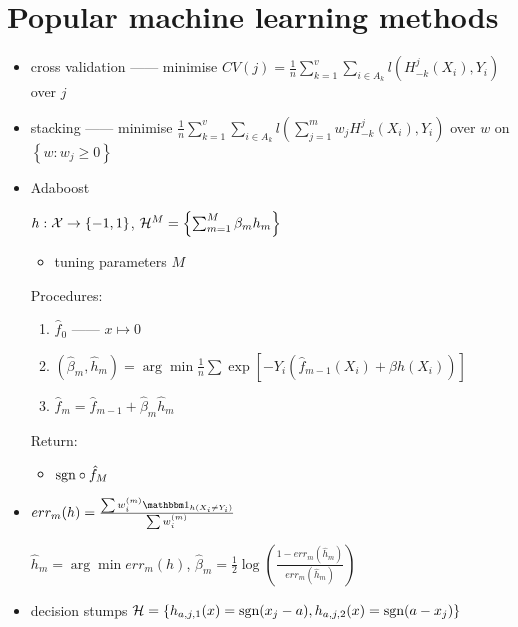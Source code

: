 \section{Popular machine learning methods}\label{sec:popular-machine-learning-methods}

\begin{itemize}
    \item cross validation ------ minimise $CV(j) = \frac{1}{n} \sum_{k=1}^v \sum_{i \in A_k} l(H_{-k}^j(X_i), Y_i)$ over $j$
    \item stacking ------ minimise $\frac{1}{n} \sum_{k=1}^v \sum_{i \in A_k} l(\sum_{j=1}^m w_j H_{-k}^j(X_i), Y_i)$ over $w$ on $\left\{ w : w_j \geq 0 \right\}$
    \item Adaboost
    \begin{setting}
        $h : \mathcal{X} \rightarrow \left\{ -1, 1 \right\}$, $\mathcal{H}^M = \left\{ \sum_{m=1}^M \beta_m h_m  \right\}$
    \end{setting}
    \begin{itemize}
        \item tuning parameters $M$
    \end{itemize}
    Procedures:
    \begin{enumerate}
        \item $\hat f_0$ ------ $x \mapsto 0$
        \item $(\hat \beta_m, \hat h_m) = \arg \min \frac{1}{n} \sum \exp [-Y_i(\hat f_{m-1}(X_i) + \beta h(X_i))]$
        \item $\hat f_m = \hat f_{m-1} + \hat \beta_m \hat h_m$
    \end{enumerate}
    Return:
    \begin{itemize}
        \item $\textnormal{sgn} \circ \hat f_M$
    \end{itemize}
    \item $err_m(h) = \frac{\sum w_{i}^{(m)} \In_{h(X_i \neq Y_i)}}{\sum w_i^{(m)}}$
    \begin{fact}
        $\hat h_m = \arg \min err_m(h)$, $\hat \beta_m = \frac{1}{2} \log \left( \frac{1 - err_m(\hat h_m)}{err_m(\hat h_m)} \right)$
    \end{fact}
\end{itemize}

\begin{example}
    \begin{itemize}
        \item decision stumps $\mathcal{H} = \left\{ h_{a,j,1}(x) = \textnormal{sgn}(x_j - a), h_{a, j,2}(x) = \textnormal{sgn} (a - x_j) \right\}$
    \end{itemize}
\end{example}